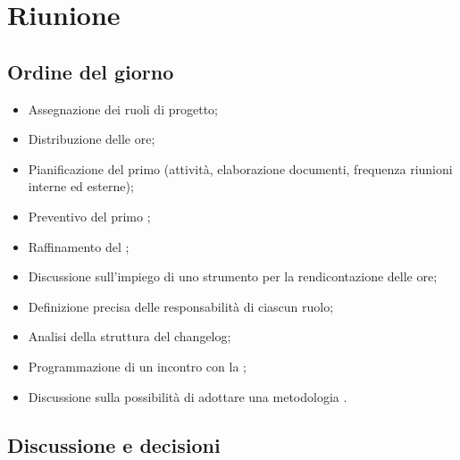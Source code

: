 \section{Riunione}
\subsection{Ordine del giorno}
\begin{itemize}
	\item Assegnazione dei ruoli di progetto;
	\item Distribuzione delle ore;
	\item Pianificazione del primo  (attività, elaborazione documenti, frequenza riunioni interne ed esterne);
	\item Preventivo del primo ;
	\item Raffinamento del \glossario{\WoW};
	\item Discussione sull'impiego di uno strumento per la rendicontazione delle ore;
	\item Definizione precisa delle responsabilità di ciascun ruolo;
	\item Analisi della struttura del changelog;
	\item Programmazione di un incontro con la ;
	\item Discussione sulla possibilità di adottare una metodologia .
\end{itemize}

\subsection{Discussione e decisioni}

